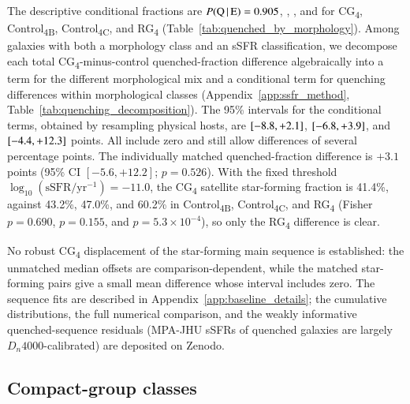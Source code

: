 \documentclass{aa}
\newcommand{\CB}{Control\textsubscript{4B}}
\newcommand{\CC}{Control\textsubscript{4C}}
\newcommand{\CG}{CG\textsubscript{4}}
\newcommand{\RG}{RG\textsubscript{4}}
\begin{document}
The descriptive conditional fractions are \(P(\mathrm{Q}\,|\,\mathrm{E}) = 0.905\), \qEcb, \qEcc, and \qErg{} for \CG{}, \CB{}, \CC{}, and \RG{} (Table~\ref{tab:quenched_by_morphology}). Among galaxies with both a morphology class and an sSFR classification, we decompose each total \CG{}-minus-control quenched-fraction difference algebraically \citep{Kitagawa1955} into a term for the different morphological mix and a conditional term for quenching differences within morphological classes (Appendix~\ref{app:ssfr_method}, Table~\ref{tab:quenching_decomposition}). The 95\% intervals for the conditional terms, obtained by resampling physical hosts, are \([-8.8, +2.1]\), \([-6.8, +3.9]\), and \([-4.4, +12.3]\) points. All include zero and still allow differences of several percentage points. The individually matched quenched-fraction difference is \(+3.1\) points (95\% CI \([-5.6, +12.2]\); \(p = 0.526\)). With the fixed threshold $\log_{10}(\mathrm{sSFR}/\mathrm{yr}^{-1})=-11.0$, the \CG{} satellite star-forming fraction is 41.4\%, against 43.2\%, 47.0\%, and 60.2\% in \CB{}, \CC{}, and \RG{} (Fisher \(p = 0.690\), \(p = 0.155\), and \(p = 5.3\times 10^{-4}\)), so only the \RG{} difference is clear.







No robust \CG{} displacement of the star-forming main sequence is established: the unmatched median offsets are comparison-dependent, while the matched star-forming pairs give a small mean difference whose interval includes zero. The sequence fits are described in Appendix~\ref{app:baseline_details}; the cumulative distributions, the full numerical comparison, and the weakly informative quenched-sequence residuals (MPA-JHU sSFRs of quenched galaxies are largely \(D_n4000\)-calibrated) are deposited on Zenodo.


\subsection{Compact-group classes}\label{sec:cg_classes}
\end{document}
